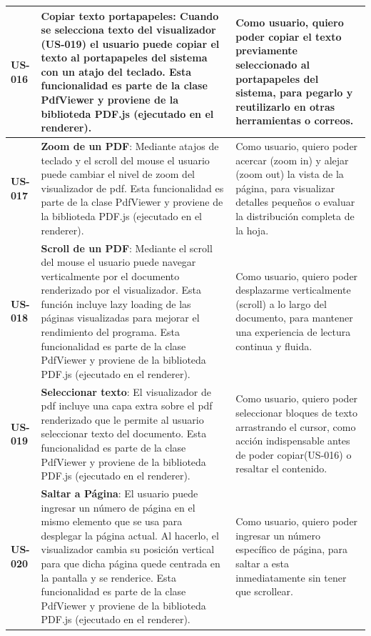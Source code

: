\begin{longtable}{|l||p{7cm}|p{4.5cm}|}
\hline
\textbf{US-016} & \textbf{Copiar texto portapapeles}: Cuando se selecciona texto del visualizador (US-019) el usuario puede copiar el texto al portapapeles del sistema con un atajo del teclado. Esta funcionalidad es parte de la clase PdfViewer y proviene de la biblioteda PDF.js (ejecutado en el renderer).& Como usuario, quiero poder copiar el texto previamente seleccionado al portapapeles del sistema, para pegarlo y reutilizarlo en otras herramientas o correos.\\
\hline
\textbf{US-017} & \textbf{Zoom de un PDF}: Mediante atajos de teclado y el scroll del mouse el usuario puede cambiar el nivel de zoom del visualizador de pdf.  Esta funcionalidad es parte de la clase PdfViewer y proviene de la biblioteda PDF.js (ejecutado en el renderer). & Como usuario, quiero poder acercar (zoom in) y alejar (zoom out) la vista de la página, para visualizar detalles pequeños o evaluar la distribución completa de la hoja.\\
\hline
\textbf{US-018} & \textbf{Scroll de un PDF}: Mediante el scroll del mouse el usuario puede navegar verticalmente por el documento renderizado por el visualizador. Esta función incluye lazy loading de las páginas visualizadas para mejorar el rendimiento del programa.  Esta funcionalidad es parte de la clase PdfViewer y proviene de la biblioteda PDF.js (ejecutado en el renderer). & Como usuario, quiero poder desplazarme verticalmente (scroll) a lo largo del documento, para mantener una experiencia de lectura continua y fluida.\\
\hline
\textbf{US-019} & \textbf{Seleccionar texto}: El visualizador de pdf incluye una capa extra sobre el pdf renderizado que le permite al usuario seleccionar texto del documento. Esta funcionalidad es parte de la clase PdfViewer y proviene de la biblioteda PDF.js (ejecutado en el renderer). & Como usuario, quiero poder seleccionar bloques de texto arrastrando el cursor, como acción indispensable antes de poder copiar(US-016) o resaltar el contenido.\\
\hline
\textbf{US-020} & \textbf{Saltar a Página}: El usuario puede ingresar un número de página en el mismo elemento que se usa para desplegar la página actual. Al hacerlo, el visualizador cambia su posición vertical para que dicha página quede centrada en la pantalla y se renderice. Esta funcionalidad es parte de la clase PdfViewer y proviene de la biblioteda PDF.js (ejecutado en el renderer). & Como usuario, quiero poder ingresar un número específico de página, para saltar a esta inmediatamente sin tener que scrollear.\\

\end{longtable}
